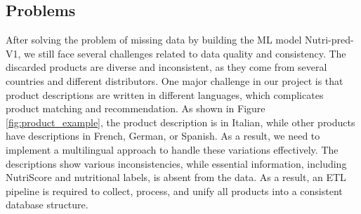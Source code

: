 \subsection{Problems} 
After solving the problem of missing data by building the ML model Nutri-pred-V1, we still face several challenges related to data quality and consistency.
The discarded products are diverse and inconsistent, as they come from
several countries and different distributors.
One major challenge in our project is that product descriptions are
written in different languages, which complicates product matching and
recommendation. As shown in Figure \ref{fig:product_example}, the product description is in
Italian, while other products have descriptions in French, German, or
Spanish. As a result, we need to implement a multilingual approach
to handle these variations effectively. The descriptions show various
inconsistencies, while essential information, including NutriScore and
nutritional labels, is absent from the data.
As a result, an ETL pipeline is required to collect, process, and unify all
products into a consistent database structure.
